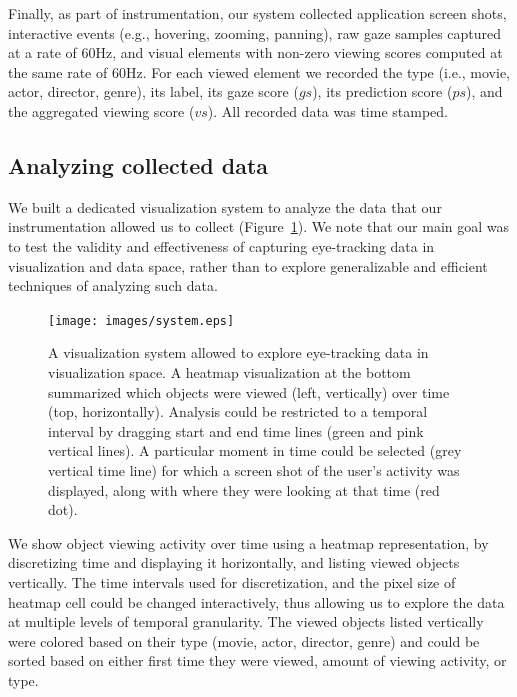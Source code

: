 Finally, as part of instrumentation, our system collected application screen shots, interactive events (e.g., hovering, zooming, panning), raw gaze samples captured at a rate of $60$Hz, and visual elements with non-zero viewing scores computed at the same rate of $60$Hz. For each viewed element we recorded the type (i.e., movie, actor, director, genre), its label, its gaze score ($gs$), its prediction score ($ps$), and the aggregated viewing score ($vs$). All recorded data was time stamped. 

\subsection{Analyzing collected data}

We built a dedicated visualization system to analyze the data that our instrumentation allowed us to collect (Figure~\ref{fig:system}). We note that our main goal was to test the validity and effectiveness of capturing eye-tracking data in visualization and data space, rather than to explore generalizable and efficient techniques of analyzing such data.  

\begin{figure}[htb]
  \centering
  \texttt{[image: images/system.eps]}
  \caption{A visualization system allowed to explore eye-tracking data in visualization space. A heatmap visualization at the bottom summarized which objects were viewed (left, vertically) over time (top, horizontally). Analysis could be restricted to a temporal interval by dragging start and end time lines (green and pink vertical lines). A particular moment in time could be selected (grey vertical time line) for which a screen shot of the user's activity was displayed, along with where they were looking at that time (red dot). }
	\label{fig:system}
\end{figure}

We show object viewing activity over time using a heatmap representation, by discretizing time and displaying it horizontally, and listing viewed objects vertically. The time intervals used for discretization, and the pixel size of heatmap cell could be changed interactively, thus allowing us to explore the data at multiple levels of temporal granularity. The viewed objects listed vertically were colored based on their type (movie, actor, director, genre) and could be sorted based on either first time they were viewed, amount of viewing activity, or type. 

